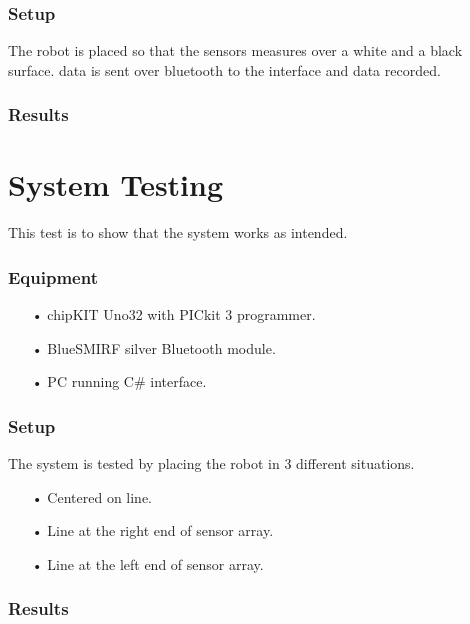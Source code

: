 \subsubsection{Setup}
The robot is placed so that the sensors measures over a white and a black surface.
data is sent over bluetooth to the interface and data recorded.

\subsubsection{Results}

\section{System Testing}
This test is to show that the system works as intended.

\subsubsection{Equipment}
\begin{enumerate}
	\item[•]chipKIT Uno32 with PICkit 3 programmer.
	\item[•]BlueSMIRF silver Bluetooth module.
	\item[•]PC running C\# interface.
\end{enumerate}

\subsubsection{Setup}
The system is tested by placing the robot in 3 different situations.
\begin{enumerate}
	\item[•]Centered on line.
	\item[•]Line at the right end of sensor array.
	\item[•]Line at the left end of sensor array.
\end{enumerate}

\subsubsection{Results}

